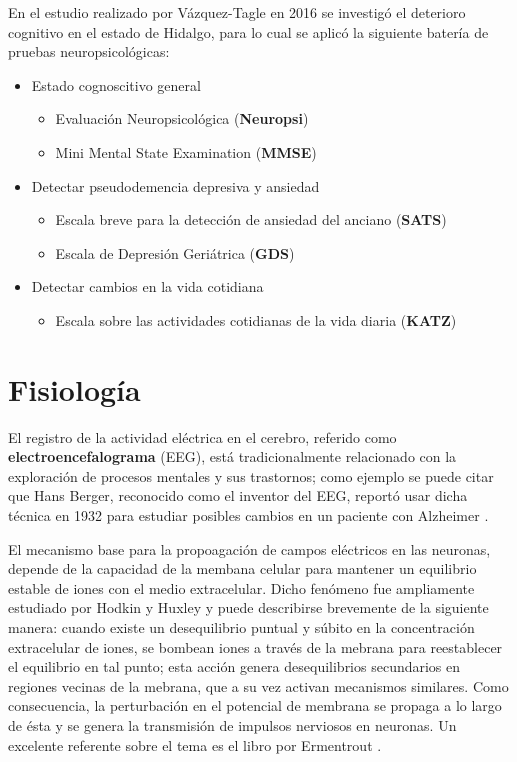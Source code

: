 En el estudio realizado por Vázquez-Tagle en 2016 \cite{VazquezTagle16} se investigó el deterioro
cognitivo en el estado de Hidalgo, para lo cual se aplicó la siguiente batería de pruebas
neuropsicológicas:
\begin{itemize}
\item Estado cognoscitivo general
\begin{itemize}
\item {Evaluación Neuropsicológica (\textbf{Neuropsi})} \cite{Solis03}
\item {Mini Mental State Examination (\textbf{MMSE})} \cite{Velasco15}
\end{itemize}
\item Detectar pseudodemencia depresiva y ansiedad
\begin{itemize}
\item {Escala breve para la detección de ansiedad del anciano (\textbf{SATS})} \cite{Vargas11}
\item {Escala de Depresión Geriátrica (\textbf{GDS})} \cite{Yesavage82,Greenberg12}
\end{itemize}
\item Detectar cambios en la vida cotidiana
\begin{itemize}
\item {Escala sobre las actividades cotidianas de la vida diaria (\textbf{KATZ})} \cite{Roumec14}
\end{itemize}
\end{itemize}


\section{Fisiología}

El registro de la actividad eléctrica en el cerebro, referido como \textbf{electroencefalograma} 
(EEG), está tradicionalmente relacionado con la exploración de procesos mentales y sus trastornos; 
como ejemplo se puede citar que Hans Berger, reconocido como el inventor del EEG, reportó usar 
dicha técnica en 1932 para estudiar posibles cambios en un paciente con Alzheimer 
\cite{historia_eeg}.

El mecanismo base para la propoagación de campos eléctricos en las neuronas, depende de la 
capacidad de la membana celular para mantener un equilibrio estable de iones con el medio 
extracelular.
%
Dicho fenómeno fue ampliamente estudiado por Hodkin y Huxley y puede describirse brevemente de la 
siguiente manera: cuando existe un desequilibrio puntual y súbito en la concentración extracelular 
de iones, se bombean iones a través de la mebrana para reestablecer el equilibrio en tal punto; 
esta acción genera desequilibrios secundarios en regiones vecinas de la mebrana, que a su vez 
activan mecanismos similares. 
%
Como consecuencia, la perturbación en el potencial de membrana se propaga a lo largo de ésta y se 
genera la transmisión de impulsos nerviosos en neuronas.
%
Un excelente referente sobre el tema es el libro por Ermentrout \cite{Ermentrout10}.

